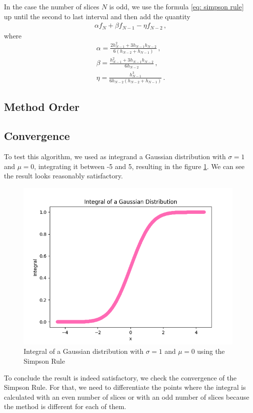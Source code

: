 \documentclass[11pt]{article}
\begin{document}
In the case the number of slices $N$ is odd, we use the formula \eqref{eq: simpson rule} up until the second to last interval and then add the quantity
\begin{align}
    &\alpha f_N + \beta f_{N-1} - \eta f_{N-2}\, ,
\end{align}
where
\begin{align}
    &\alpha=\frac{2h_{N-1}^2+3h_{N-1}h_{N-2}}{6(h_{N-2}+h_{N-1})}\, ,\\
    &\beta=\frac{h_{N-1}^2+3h_{N-1}h_{N-2}}{6h_{N-2}}\, ,\\
    &\eta=\frac{h_{N-1}^3}{6h_{N-2}(h_{N-2}+h_{N-1})}\, .
\end{align}


\subsection{Method Order}

\subsection{Convergence}

To test this algorithm, we used as integrand a Gaussian distribution with $\sigma=1$ and $\mu=0$, integrating it between -5 and 5, resulting in the figure \ref{fig:gauss_integral}. We can see the result looks reasonably satisfactory.

\begin{figure}[H]
    \centering
    \includegraphics[width=0.5\linewidth]{Images/gauss_integral.png}
    \caption{Integral of a Gaussian distribution with $\sigma=1$ and $\mu=0$ using the Simpson Rule}
    \label{fig:gauss_integral}
\end{figure}

To conclude the result is indeed satisfactory, we check the convergence of the Simpson Rule. For that, we need to differentiate the points where the integral is calculated with an even number of slices or with an odd number of slices because the method is different for each of them.
\end{document}

